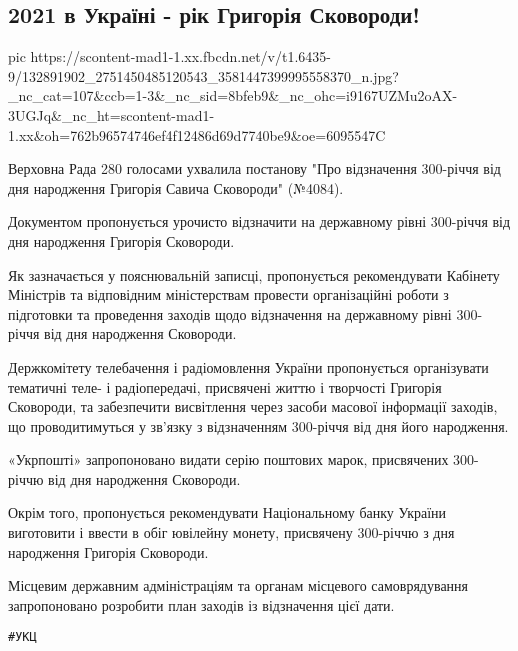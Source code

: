  
 
 
 
 
\subsection{2021 в Україні - рік Григорія Сковороди!}
\label{sec:24_12_2020.fb.ukc_ukrainianculturalcenter.1.skovoroda_year_2021}

\ifcmt
  pic https://scontent-mad1-1.xx.fbcdn.net/v/t1.6435-9/132891902_2751450485120543_3581447399995558370_n.jpg?_nc_cat=107&ccb=1-3&_nc_sid=8bfeb9&_nc_ohc=i9167UZMu2oAX-3UGJq&_nc_ht=scontent-mad1-1.xx&oh=762b96574746ef4f12486d69d7740be9&oe=6095547C
\fi

Верховна Рада 280 голосами ухвалила постанову "Про відзначення 300-річчя від
дня народження Григорія Савича Сковороди" (№4084).

Документом пропонується урочисто відзначити на державному рівні 300-річчя від
дня народження Григорія Сковороди.

Як зазначається у пояснювальній записці, пропонується рекомендувати Кабінету
Міністрів та відповідним міністерствам провести організаційні роботи з
підготовки та проведення заходів щодо відзначення на державному рівні 300-річчя
від дня народження Сковороди.

Держкомітету телебачення і радіомовлення України пропонується організувати
тематичні теле- і радіопередачі, присвячені життю і творчості Григорія
Сковороди, та забезпечити висвітлення через засоби масової інформації заходів,
що проводитимуться у зв'язку з відзначенням 300-річчя від дня його народження.

«Укрпошті» запропоновано видати серію поштових марок, присвячених 300-річчю від
дня народження Сковороди.

Окрім того, пропонується рекомендувати Національному банку України виготовити і
ввести в обіг ювілейну монету, присвячену 300-річчю з дня народження Григорія
Сковороди.

Місцевим державним адміністраціям та органам місцевого самоврядування
запропоновано розробити план заходів із відзначення цієї дати.

\verb|#УКЦ|
